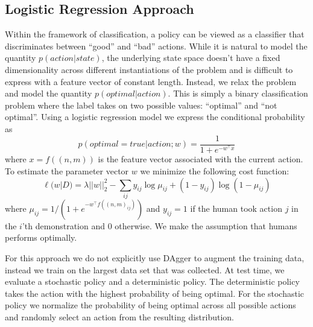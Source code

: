 \subsection{Logistic Regression Approach}
Within the framework of classification, a policy can be viewed as a classifier that discriminates between “good” and “bad” actions. While it is natural to model the quantity $p(action|state)$, the underlying state space doesn't have a fixed dimensionality across different instantiations of the problem and is difficult to express with a feature vector of constant length. Instead, we relax the problem and model the quantity $p(optimal|action)$. This is simply a binary classification problem where the label takes on two possible values: ``optimal'' and ``not optimal''. Using a logistic regression model we express the conditional probability as $$p(optimal=true|action;w) = \frac{1}{1+e^{-w^\top x}}$$ where $x = f((n,m))$ is the feature vector associated with the current action. To estimate the parameter vector $w$ we minimize the following cost function: $$\ell(w|D)=\lambda||w||^2_2-\sum_{ij} y_{ij}\log\mu_{ij}+(1-y_{ij})\log(1-\mu_{ij})$$ where $\mu_{ij}=1/(1+e^{-w^\top f((n,m)_{ij})})$ and $y_{ij}=1$ if the human took action $j$ in the $i$'th demonstration and $0$ otherwise. We make the assumption that humans performs optimally.

For this approach we do not explicitly use DAgger to augment the training data, instead we train on the largest data set that was collected. At test time, we evaluate a stochastic policy and a deterministic policy. The deterministic policy takes the action with the highest probability of being optimal. For the stochastic policy we normalize the probability of being optimal across all possible actions and randomly select an action from the resulting distribution.